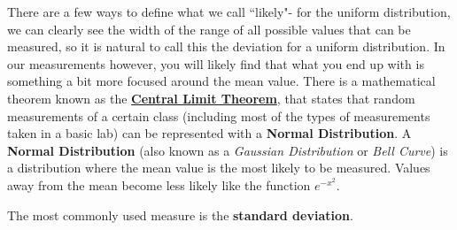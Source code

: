 \documentclass{article}
\begin{document}
There are a few ways to define what we call ``likely"- for the uniform distribution, we can clearly see the width of the range of all possible values that can be measured, so it is natural to call this the deviation for a uniform distribution.
In our measurements however, you will likely find that what you end up with is something a bit more focused around the mean value. There is a mathematical theorem known as the \textbf{\href{https://www.geeksforgeeks.org/maths/central-limit-theorem/}{Central Limit Theorem}}, that states that random measurements of a certain class (including most of the types of measurements taken in a basic lab) can be represented with a \textbf{Normal Distribution}.
A \textbf{Normal Distribution} (also known as a \emph{Gaussian Distribution} or \emph{Bell Curve}) is a distribution where the mean value is the most likely to be measured. Values away from the mean become less likely like the function $e^{-x^2}$.

The most commonly used measure is the \textbf{standard deviation}.
\end{document}
